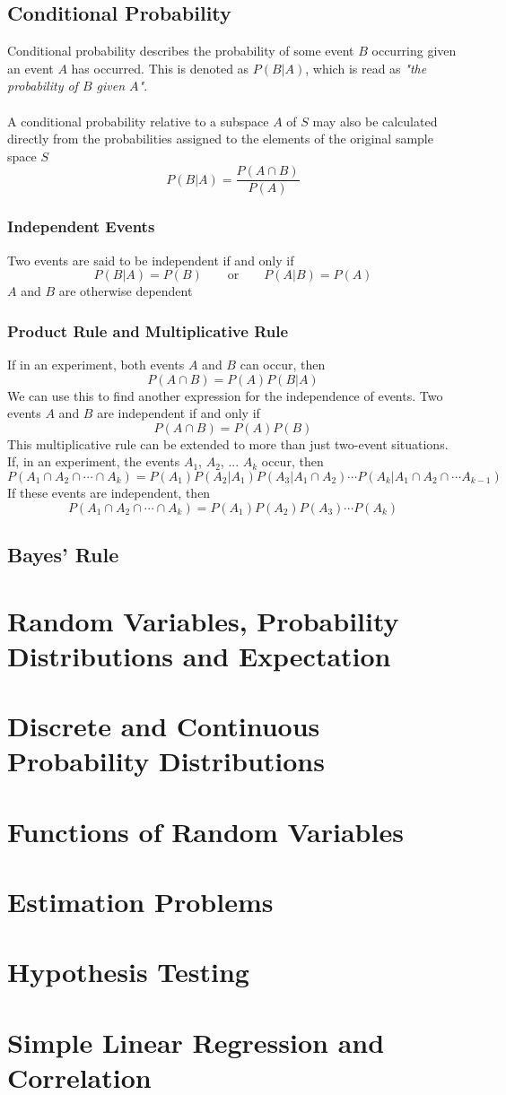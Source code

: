 \documentclass[11pt]{article}
\begin{document}
\subsection{Conditional Probability}
Conditional probability describes the probability of some event $B$ occurring given an event $A$ has occurred. This is denoted as $P(B|A)$, which is read as \textit{"the probability of $B$ given $A$"}. \\ \\ A conditional probability relative to a subspace $A$ of $S$ may also be calculated directly from the probabilities assigned to the elements of the original sample space $S$
$$ P(B|A) = \frac{P(A \cap B)}{P(A)}$$

\subsubsection{Independent Events}
Two events are said to be independent if and only if 
$$P(B|A) = P(B) \quad \quad \text{or} \quad  \quad P(A|B) = P(A)$$
$A$ and $B$ are otherwise dependent

\subsubsection{Product Rule and Multiplicative Rule}
If in an experiment, both events $A$ and $B$ can occur, then 
$$ P(A \cap B) = P(A)P(B|A)$$
We can use this to find another expression for the independence of events. Two events $A$ and $B$ are independent if and only if 
$$ P(A \cap B) = P(A)P(B)$$
This multiplicative rule can be extended to more than just two-event situations. If, in an experiment, the events $A_1$, $A_2$, ... $A_k$ occur, then
$$ P(A_1 \cap A_2 \cap \cdots \cap A_k) = P(A_1)P(A_2|A_1)P(A_3|A_1 \cap A_2) \cdots P(A_k| A_1 \cap A_2 \cap \cdots A_{k-1})$$ If these events are independent, then 
$$ P(A_1 \cap A_2 \cap \cdots \cap A_k) = P(A_1)P(A_2)P(A_3) \cdots P(A_k)$$

\subsection{Bayes' Rule}

\pagebreak

\section{Random Variables, Probability Distributions and Expectation}
\section{Discrete and Continuous Probability Distributions}
\section{Functions of Random Variables}
\section{Estimation Problems}
\section{Hypothesis Testing}
\section{Simple Linear Regression and Correlation}
\end{document}
